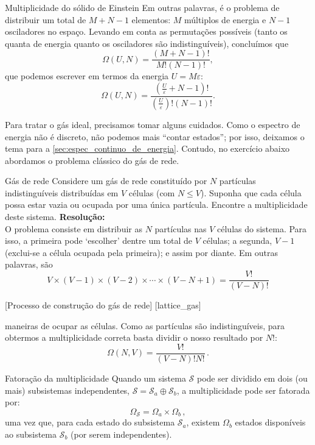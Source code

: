 \begin{example}{Multiplicidade do sólido de Einstein}{}
        Em outras palavras, é o problema de distribuir um total de $M+N-1$ elementos: $M$ múltiplos de energia e $N-1$ osciladores no espaço. Levando em conta as permutações possíveis (tanto os quanta de energia quanto os osciladores são indistinguíveis), concluímos que \[\Omega(U,N)=\frac{(M+N-1)!}{M!(N-1)!},\] que podemos escrever em termos da energia $U=M\varepsilon$: \[\Omega(U,N)=\frac{\left(\frac{U}{\varepsilon}+N-1\right)!}{\left(\frac{U}{\varepsilon}\right)!(N-1)!}.\]
    \end{example}

    Para tratar o gás ideal, precisamos tomar alguns cuidados. Como o espectro de energia não é discreto, não podemos mais ``contar estados''; por isso, deixamos o tema para a \cref{sec:espec_continuo_de_energia}. Contudo, no exercício abaixo abordamos o problema clássico do gás de rede.

    \begin{solved}{Gás de rede}{}
        Considere um gás de rede constituído por $N$ partículas indistinguíveis distribuídas em $V$ células (com $N\leq V$). Suponha que cada célula possa estar vazia ou ocupada por uma única partícula. Encontre a multiplicidade deste sistema.
        \tcblower
        \noindent\textbf{Resolução:}\\
        \indent O problema consiste em distribuir as $N$ partículas nas $V$ células do sistema. Para isso, a primeira pode `escolher' dentre um total de $V$ células; a segunda, $V-1$ (exclui-se a célula ocupada pela primeira); e assim por diante. Em outras palavras, são
        \[ V\times(V-1)\times(V-2)\times\cdots\times(V-N+1) = \frac{V!}{(V-N)!}\]

        \tikzFig%
            {\LatticeGas}%
            [Processo de construção do gás de rede]%
            [lattice_gas]


        maneiras de ocupar as células. Como as partículas são indistinguíveis, para obtermos a multiplicidade correta basta dividir o nosso resultado por $N!$:
        \begin{equation}\label{eq:multiplicidade_gas_de_rede}
            \Omega(N,V) = \frac{V!}{(V-N)!N!}\,.
        \end{equation}
    \end{solved}

    \begin{statementbox}{Fatoração da multiplicidade}
        Quando um sistema $\mathcal{S}$ pode ser dividido em dois (ou mais) subsistemas independentes, $\mathcal{S}=\mathcal{S}_a\oplus\mathcal{S}_b$, a multiplicidade pode ser fatorada por:
        \begin{equation}
            \Omega_{\mathcal{S}} = \Omega_{a} \times \Omega_{b}\,,
        \end{equation}
        uma vez que, para cada estado do subsistema $\mathcal{S}_a$, existem $\Omega_{b}$ estados disponíveis ao subsistema $\mathcal{S}_b$ (por serem independentes).
    \end{statementbox}

